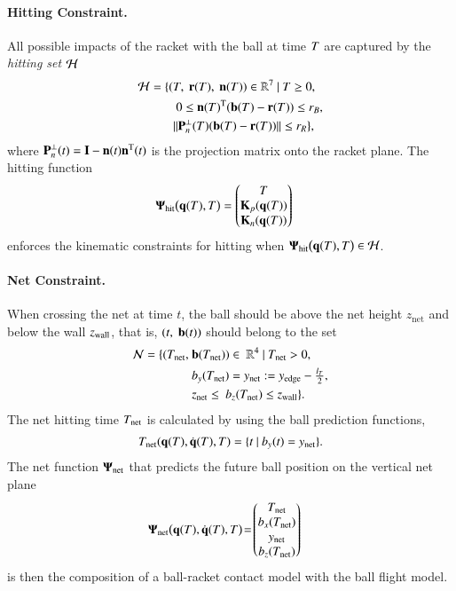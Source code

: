 \paragraph{\textbf{Hitting Constraint}.} All possible impacts of the racket with the ball at time $T$ are captured by the \emph{hitting set} $\mathcal{H}$
%
%
\begin{align}
\mathcal{H} = \{(&T,\ \boldsymbol{\mathrm{r}}(T),\ \boldsymbol{\mathrm{n}}(T)) \in \mathbb{R}^{7} \ | \ T \geq 0, \\
&\ 0 \leq \boldsymbol{\mathrm{n}}(T)^{\mathrm{T}}(\boldsymbol{\mathrm{b}}(T) - \boldsymbol{\mathrm{r}}(T)) \leq r_{B}, \\
& \|\boldsymbol{\mathrm{P}}_{n}^{\perp}(T)(\boldsymbol{\mathrm{b}}(T) - \boldsymbol{\mathrm{r}}(T))\| \leq r_{R} \}, \label{hitCond}
\end{align}
%
\noindent where $\boldsymbol{\mathrm{P}}_{n}^{\perp}(t) = \boldsymbol{\mathrm{I}} - \boldsymbol{\mathrm{n}}(t)\boldsymbol{\mathrm{n}}^{\mathrm{T}}(t)$ is the projection matrix onto the racket plane. The hitting function
%
\begin{align}
&\boldsymbol{\mathrm{\Psi}}_{\mathrm{hit}}\big(\boldsymbol{\mathrm{q}}(T), T\big) = \begin{pmatrix}
T \\ \boldsymbol{\mathrm{K}}_{p}(\boldsymbol{\mathrm{q}}(T)) \\ \boldsymbol{\mathrm{K}}_{n}(\boldsymbol{\mathrm{q}}(T))
\end{pmatrix} \label{switchCond1} 
\end{align}
%
\noindent enforces the kinematic constraints for hitting when $\boldsymbol{\mathrm{\Psi}}_{\mathrm{hit}}\big(\boldsymbol{\mathrm{q}}(T), T\big) \in \mathcal{H}$.
%
\paragraph{\textbf{Net Constraint}.} When crossing the net at time $t$, the ball should be above the net height $z_{\mathrm{net}}$ and below the wall $z_{\mathrm{wall}}$, that is, $(t,\ \boldsymbol{\mathrm{b}}(t))$ should belong to the set 
%
\begin{equation}
\begin{aligned}
\mathcal{N} = \{(T_{\mathrm{net}}, \ &\boldsymbol{\mathrm{b}}(T_{\mathrm{net}}))\in \ \mathbb{R}^{4} \ | \ T_{\mathrm{net}} > 0, \\ 
&b_y(T_{\mathrm{net}}) = y_{\mathrm{net}} := y_{\mathrm{edge}} - \tfrac{l_{T}}{2}, \\
&z_{\mathrm{net}} \leq \ b_z(T_{\mathrm{net}}) \leq z_{\mathrm{wall}} \}. \label{netCond}
\end{aligned}
\end{equation}
%
The net hitting time $T_{\mathrm{net}}$ is calculated by using the ball prediction functions,
%
\begin{align}
T_{\mathrm{net}}(\boldsymbol{\mathrm{q}}(T),\dot{\boldsymbol{\mathrm{q}}}(T),T) = \{t \ | \ b_y(t) = y_{\mathrm{net}}\}. \label{netTime}
\end{align}
%
The net function $\boldsymbol{\mathrm{\Psi}}_{\mathrm{net}}$ that predicts the future ball position on the vertical net plane
%
\begin{align}
&\boldsymbol{\mathrm{\Psi}}_{\mathrm{net}}\big(\boldsymbol{\mathrm{q}}(T),\dot{\boldsymbol{\mathrm{q}}}(T),T\big) \!= \!\begin{pmatrix}
T_{\mathrm{net}} \\ b_x(T_{\mathrm{net}}) \\ y_{\mathrm{net}} \\ b_z(T_{\mathrm{net}})
\end{pmatrix}\label{switchCond2}
\end{align}
%
\noindent is then the composition of a ball-racket contact model with the ball flight model.
%
